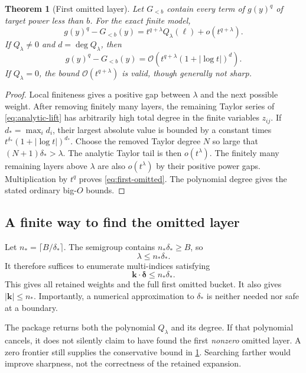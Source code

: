\documentclass[11pt,a4paper]{article}
\numberwithin{equation}{section}
\newtheorem{theorem}{Theorem}[section]
\theoremstyle{definition}\newtheorem{definition}[theorem]{Definition}
\theoremstyle{remark}\newtheorem{remark}[theorem]{Remark}
\newcommand{\OO}{\mathcal O}\newcommand{\dd}{\mathrm d}
\begin{document}
\begin{theorem}[First omitted layer]
\label{thm:remainder}
Let $G_{<b}$ contain every term of $g(y)^q$ of target power less than $b$.
For the exact finite model,
\begin{equation}
 g(y)^q-G_{<b}(y)
 =t^{q+\lambda}Q_\lambda(\ell)+o(t^{q+\lambda}).
 \label{eq:first-omitted}
\end{equation}
If $Q_\lambda\ne0$ and $d=\deg Q_\lambda$, then
\begin{equation}
 g(y)^q-G_{<b}(y)
 =\OO\!\left(t^{q+\lambda}(1+|\log t|)^d\right).
 \label{eq:remainder-general}
\end{equation}
If $Q_\lambda=0$, the bound $\OO(t^{q+\lambda})$ is valid, though generally
not sharp.
\end{theorem}

\begin{proof}
Local finiteness gives a positive gap between $\lambda$ and the next
possible weight. After removing finitely many layers, the remaining
Taylor series of \cref{eq:analytic-lift} has arbitrarily high total degree
in the finite variables $z_{ij}$. If $d_*=\max_i d_i$, their largest
absolute value is bounded by a constant times
$t^{\delta_*}(1+|\log t|)^{d_*}$. Choose the removed Taylor degree $N$ so
large that $(N+1)\delta_*>\lambda$. The analytic Taylor tail is then
$o(t^\lambda)$. The finitely many remaining layers above $\lambda$ are
also $o(t^\lambda)$ by their positive power gaps. Multiplication by
$t^q$ proves \cref{eq:first-omitted}. The polynomial degree gives the
stated ordinary big-$O$ bounds.
\end{proof}

\subsection{A finite way to find the omitted layer}

Let $n_*=\lceil B/\delta_*\rceil$. The semigroup contains
$n_*\delta_*\ge B$, so
\[
 \lambda\le n_*\delta_*.
\]
It therefore suffices to enumerate multi-indices satisfying
\begin{equation}
 \bm k\cdot\bm\delta\le n_*\delta_*.
 \label{eq:enumeration-bound}
\end{equation}
This gives all retained weights and the full first omitted bucket. It
also gives $|\bm k|\le n_*$. Importantly, a numerical approximation to
$\delta_*$ is neither needed nor safe at a boundary.

The package returns both the polynomial $Q_\lambda$ and its degree. If
that polynomial cancels, it does not silently claim to have found the
first \emph{nonzero} omitted layer. A zero frontier still supplies the
conservative bound in \cref{thm:remainder}. Searching farther would
improve sharpness, not the correctness of the retained expansion.
\end{document}
